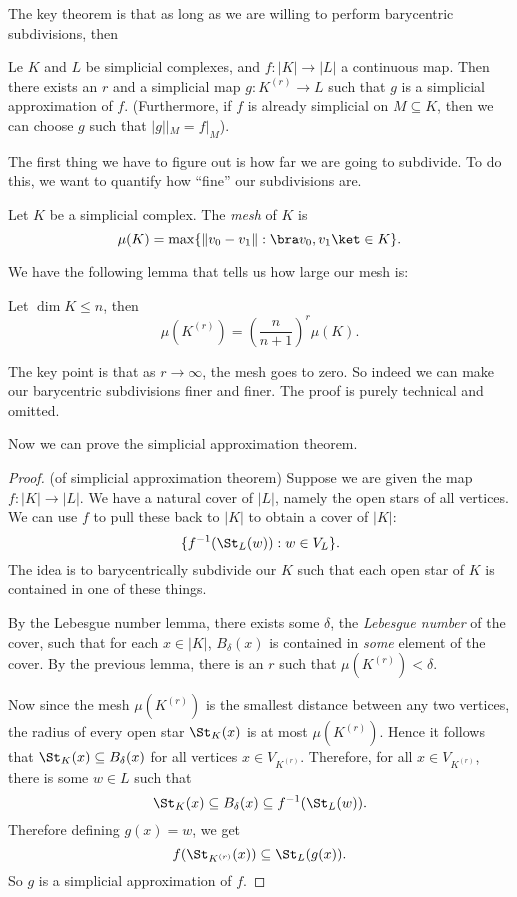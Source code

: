 \documentclass[a4paper]{article}
\begin{document}
The key theorem is that as long as we are willing to perform barycentric subdivisions, then

\begin{thm}
  Le $K$ and $L$ be simplicial complexes, and $f: |K| \to |L|$ a continuous map. Then there exists an $r$ and a simplicial map $g: K^{(r)} \to L$ such that $g$ is a simplicial approximation of $f$. (Furthermore, if $f$ is already simplicial on $M\subseteq K$, then we can choose $g$ such that $|g||_M = f|_M$).
\end{thm}

The first thing we have to figure out is how far we are going to subdivide. To do this, we want to quantify how ``fine'' our subdivisions are.
\begin{defi}[Mesh]
  Let $K$ be a simplicial complex. The \emph{mesh} of $K$ is
  \[
    \mu(K) = \max\{\|v_0 - v_1\| : \bra v_0, v_1\ket \in K\}.
  \]
\end{defi}

We have the following lemma that tells us how large our mesh is:
\begin{lemma}
  Let $\dim K \leq n$, then
  \[
    \mu(K^{(r)}) = \left(\frac{n}{n + 1}\right)^r \mu(K).
  \]
\end{lemma} %
The key point is that as $r \to \infty$, the mesh goes to zero. So indeed we can make our barycentric subdivisions finer and finer. The proof is purely technical and omitted.

Now we can prove the simplicial approximation theorem.

\begin{proof}(of simplicial approximation theorem)
  Suppose we are given the map $f: |K| \to |L|$. We have a natural cover of $|L|$, namely the open stars of all vertices. We can use $f$ to pull these back to $|K|$ to obtain a cover of $|K|$:
  \[
    \{f^{-1}(\St_L(w)) : w \in V_L\}.
  \]
  The idea is to barycentrically subdivide our $K$ such that each open star of $K$ is contained in one of these things.

  By the Lebesgue number lemma, there exists some $\delta$, the \emph{Lebesgue number} of the cover, such that for each $x \in |K|$, $B_\delta(x)$ is contained in \emph{some} element of the cover. By the previous lemma, there is an $r$ such that $\mu(K^{(r)}) < \delta$. %

  Now since the mesh $\mu(K^{(r)})$ is the smallest distance between any two vertices, the radius of every open star $\St_K(x)$ is at most $\mu(K^{(r)})$. Hence it follows that $\St_K(x) \subseteq B_\delta(x)$ for all vertices $x \in V_{K^{(r)}}$. Therefore, for all $x \in V_{K^{(r)}}$, there is some $w \in L$ such that
  \[
    \St_K(x) \subseteq B_\delta(x) \subseteq f^{-1}(\St_L(w)).
  \]
  Therefore defining $g(x) = w$, we get
  \[
    f(\St_{K^{(r)}}(x)) \subseteq \St_L(g(x)).
  \]
  So $g$ is a simplicial approximation of $f$.
\end{proof}
\end{document}
